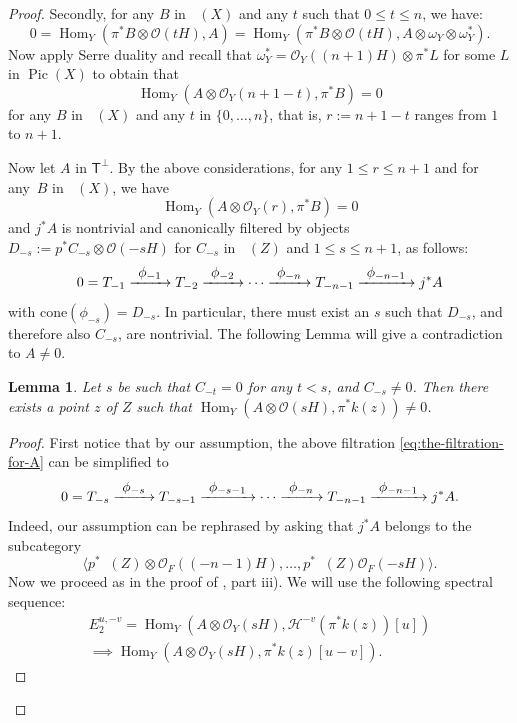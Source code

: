 \documentclass[JEP,XML,SOM,Unicode,NoEqCountersInSection]{cedram}
\newcommand{\To}[1]{\mathchoice{\xrightarrow{\textstyle\kern4pt#1\kern3pt}}{\stackrel{#1}{\longrightarrow}}{}{}}
\newcommand{\cone}{\mathrm{cone}}
\let\mathcal\mathscr
\theoremstyle{plain}
\newtheorem{lemma}[theorem]{Lemma}
\theoremstyle{definition}
\newcommand{\cat}[1]{\mathsf{#1}}
\newcommand{\sod}[1]{\langle #1 \rangle}
\DeclareMathOperator{\Db}{{\cat{D}^{\mathrm{b}}}}
\DeclareMathOperator{\Hom}{Hom}
\DeclareMathOperator{\Pic}{Pic}
\newcommand{\sheaf}[1]{\mathcal{#1}}
\newcommand{\kh}{\sheaf{H}}
\newcommand{\ko}{\sheaf{O}}\let\OO\ko\let\cO\ko
\begin{document}
\begin{proof}
Secondly, for any $B$ in $\Db(X)$ and any $t$ such that $0 \leq t \leq n$, we have:
\[
0=\Hom_Y(\pi^* B \otimes \ko(tH),A)=\Hom_Y(\pi^* B \otimes \ko(tH),A\otimes \omega_Y \otimes \omega_Y^*).
\]
Now apply Serre duality and recall that $\omega_Y^* = \ko_Y((n+1)H) \otimes \pi^* L$ for some $L$ in $\Pic(X)$ to obtain that
\[
\Hom_Y(A \otimes \ko_Y(n+1-t),\pi^* B) = 0
\]
for any $B$ in $\Db(X)$ and any $t$ in $\{0,\dots,n\}$, that is, $r:=n+1-t$ ranges from $1$ to $n+1$.

Now let $A$ in $\cat{T}^\perp$. By the above considerations, for any $1 \leq r \leq n+1$ and for any~$B$
in $\Db(X)$, we have
\begin{equation*}\label{eq:another-necessary-vanishing}
\Hom_Y(A\otimes\ko_Y(r),\pi^*B)= 0
\end{equation*}
and $j^*A$ is nontrivial and canonically filtered by objects $D_{-s}:=p^*C_{-s} \otimes \ko(-s H)$ for
$C_{-s}$ in $\Db(Z)$ and $1 \leq s \leq n+1$, as follows:
\begin{equation*}\label{eq:the-filtration-for-A}
0 = T_{-1} \To{\phi_{-1}}  T_{-2} \To{\phi_{-2}} \cdots \To{\phi_{-n}}  T_{-n-1} \To{\phi_{-n-1}}  j^*A
\end{equation*}
with $\cone(\phi_{-s}) = D_{-s}$.
In particular, there must exist an $s$ such that
$D_{-s}$, and therefore also $C_{-s}$, are nontrivial. The following Lemma will give a contradiction to $A \neq 0$.

\begin{lemma}
Let $s$ be such that $C_{-t}=0$ for any $t < s$, and $C_{-s} \neq 0$.
Then there exists a point $z$ of $Z$ such that $\Hom_Y(A \otimes \ko(sH),\pi^*k(z)) \neq 0$.
\end{lemma}

\begin{proof}
First notice that by our assumption, the above filtration \eqref{eq:the-filtration-for-A}
can be simplified to\vspace*{-3pt}
\begin{equation*}\label{eq:the-2nd-filtration-for-A}
0 = T_{-s} \To{\phi_{-s}} T_{-s-1} \To{\phi_{-s-1}} \cdots \To{\phi_{-n}} T_{-n-1} \To{\phi_{-n-1}} j^*A.
\end{equation*}
Indeed, our assumption can be rephrased by asking that $j^*A$ belongs to the subcategory\vspace*{-3pt}
\[
\sod{p^* \Db(Z) \otimes \ko_F((-n-1)H),\ldots,p^* \Db(Z) \ko_F(-sH)}.
\]
Now we proceed as in the proof of \cite[Prop.\,11.18]{Huybook}, part iii). We will use the following spectral sequence:\vspace*{-3pt}
\begin{multline*}\label{eq:the-spect-seq-in-the-lemma}
E_2^{u,-v} = \Hom_Y(A \otimes \ko_Y(sH),\kh^{-v}( \pi^* k(z))[u])\\ \implies \Hom_Y(A\otimes \ko_Y(sH), \pi^*k(z)[u-v]).
\end{multline*}


\end{proof}
\end{proof}
\end{document}
